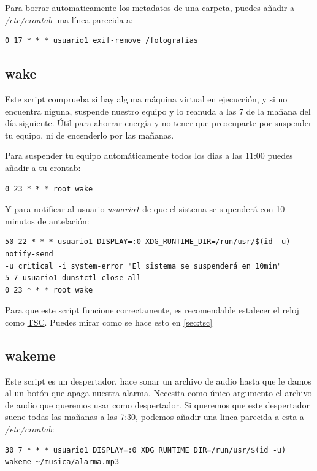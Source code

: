 \documentclass[12pt]{article}
\begin{document}
Para borrar automaticamente los metadatos de una carpeta, puedes añadir a \emph{/etc/crontab} una línea parecida a:

\begin{verbatim}
0 17 * * * usuario1 exif-remove /fotografias
\end{verbatim}

\subsection{wake}

\label{sec:wake}

Este script comprueba si hay alguna máquina virtual en ejecucción, y si no encuentra niguna, suspende nuestro equipo y lo reanuda a las 7 de la mañana del día siguiente. Útil para ahorrar energía y no tener que preocuparte por suspender tu equipo, ni de encenderlo por las mañanas.

Para suspender tu equipo automáticamente todos los dias a las 11:00 puedes añadir a tu crontab:

\begin{verbatim}
0 23 * * * root wake
\end{verbatim}

Y para notificar al usuario \emph{usuario1} de que el sistema se supenderá con 10 minutos de antelación:

\begin{verbatim}
50 22 * * * usuario1 DISPLAY=:0 XDG_RUNTIME_DIR=/run/usr/$(id -u) notify-send
-u critical -i system-error "El sistema se suspenderá en 10min"
5 7 usuario1 dunstctl close-all
0 23 * * * root wake
\end{verbatim}

Para que este script funcione correctamente, es recomendable estalecer el reloj como \href{https://en.wikipedia.org/wiki/Time_Stamp_Counter}{TSC}. Puedes mirar como se hace esto en \ref{sec:tsc}

\subsection{wakeme}

Este script es un despertador, hace sonar un archivo de audio hasta que le damos al un botón que apaga nuestra alarma. Necesita como único argumento el archivo de audio que queremos usar como despertador. Si queremos que este despertador suene todas las mañanas a las 7:30, podemos añadir una linea parecida a esta a \emph{/etc/crontab}:

\begin{lstlisting}[basicstyle=\scriptsize\ttfamily]
30 7 * * * usuario1 DISPLAY=:0 XDG_RUNTIME_DIR=/run/usr/$(id -u) wakeme ~/musica/alarma.mp3
\end{lstlisting}
\end{document}
